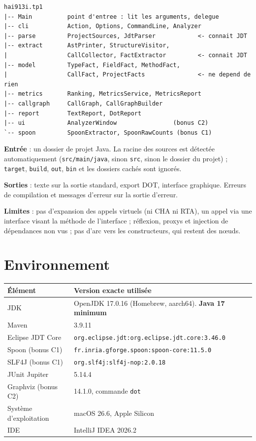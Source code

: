 \documentclass[11pt,a4paper]{article}
\begin{document}
\begin{lstlisting}
hai913i.tp1
|-- Main          point d'entree : lit les arguments, delegue
|-- cli           Action, Options, CommandLine, Analyzer
|-- parse         ProjectSources, JdtParser            <- connait JDT
|-- extract       AstPrinter, StructureVisitor,
|                 CallCollector, FactExtractor         <- connait JDT
|-- model         TypeFact, FieldFact, MethodFact,
|                 CallFact, ProjectFacts               <- ne depend de rien
|-- metrics       Ranking, MetricsService, MetricsReport
|-- callgraph     CallGraph, CallGraphBuilder
|-- report        TextReport, DotReport
|-- ui            AnalyzerWindow                (bonus C2)
`-- spoon         SpoonExtractor, SpoonRawCounts (bonus C1)
\end{lstlisting}

\textbf{Entrée} : un dossier de projet Java. La racine des sources est détectée automatiquement (\texttt{src/main/java}, sinon \texttt{src}, sinon le dossier du projet) ; \texttt{target}, \texttt{build}, \texttt{out}, \texttt{bin} et les dossiers cachés sont ignorés.

\textbf{Sorties} : texte sur la sortie standard, export DOT, interface graphique. Erreurs de compilation et messages d'erreur sur la sortie d'erreur.

\textbf{Limites} : pas d'expansion des appels virtuels (ni CHA ni RTA), un appel via une interface visant la méthode de l'interface ; réflexion, proxys et injection de dépendances non vus ; pas d'arc vers les constructeurs, qui restent des n\oe{}uds.

\section{Environnement}

\begin{table}[H]
\centering
\begin{tabular}{@{}ll@{}}
\toprule
\textbf{Élément} & \textbf{Version exacte utilisée} \\
\midrule
JDK & OpenJDK 17.0.16 (Homebrew, aarch64). \textbf{Java 17 minimum} \\
Maven & 3.9.11 \\
Eclipse JDT Core & \texttt{org.eclipse.jdt:org.eclipse.jdt.core:3.46.0} \\
Spoon (bonus C1) & \texttt{fr.inria.gforge.spoon:spoon-core:11.5.0} \\
SLF4J (bonus C1) & \texttt{org.slf4j:slf4j-nop:2.0.18} \\
JUnit Jupiter & 5.14.4 \\
Graphviz (bonus C2) & 14.1.0, commande \texttt{dot} \\
Système d'exploitation & macOS 26.6, Apple Silicon \\
IDE & IntelliJ IDEA 2026.2 \\
\bottomrule
\end{tabular}
\end{table}
\end{document}
